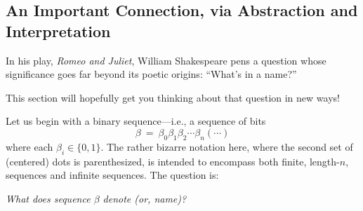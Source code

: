 \subsection{An Important Connection, via Abstraction and Interpretation}
\label{sec:sets-strings-functions}

In his play, {\it Romeo and Juliet},  William Shakespeare
pens a question whose significance goes far beyond its poetic origins:
``What's in a name?''

This section will hopefully get you thinking about that question in
new ways!

Let us begin with a binary sequence---i.e., a sequence of bits
\[ \beta \ = \ \beta_0 \beta_1 \beta_2 \cdots \beta_n (\cdots) \]
where each $\beta_i \in \{0,1\}$.  The rather bizarre notation here,
where the second set of (centered) dots is parenthesized, is intended
to encompass both finite, length-$n$, sequences and infinite
sequences.  The question is:

{\em What does sequence $\beta$ denote (or, name)?}

